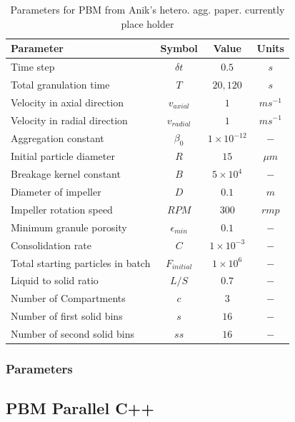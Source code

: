 \documentclass[preprint,11pt,authoryear]{elsarticle}
\begin{document}
	\begin{table}[!htb]
	\caption{Parameters for PBM from Anik's hetero. agg. paper. currently place holder} \label{table:mthds_pbm_parameters}
	\begin{center}
	\begin{tabular}{l|c|c|c}
	\hline
	\bf{Parameter} &\bf{Symbol} &\bf{Value} &\bf{Units}\\
	\hline
	Time step & $\delta t$ & $0.5$ & $s$\\
	Total granulation time & $T$ & $20, 120$ & $s$\\
	Velocity in axial direction & $v_{axial}$ & $1$ & $ms^{-1}$\\
	Velocity in radial direction & $v_{radial}$ & $1$ & $ms^{-1}$\\
	Aggregation constant & $\beta_0$ & $1\times10^{-12}$ & $-$\\
	Initial particle diameter & $R$ & $15$ & $\mu m$\\
	Breakage kernel constant & $B$ & $5\times10^{4}$ & $-$\\
	Diameter of impeller & $D$ & $0.1$ & $m$ \\
	Impeller rotation speed & $RPM$ & $300$ & $rmp$\\
	Minimum granule porosity & $\epsilon_{min}$ & $0.1$ & $-$\\
	Consolidation rate & $C$ & $1\times10^{-3}$ & $-$\\
	Total starting particles in batch & $F_{initial}$ & $1 \times 10^{6}$ & $-$\\
	Liquid to solid ratio & $L/S$ & $0.7$ & $-$ \\
	Number of Compartments & $c$ & $3$ & $-$ \\
	Number of first solid bins & $s$ & $16$ & $-$\\
	Number of second solid bins & $ss$ & $16$ & $-$\\
	\hline
	\end{tabular}
	\end{center}
	\end{table}
	
	    \subsubsection{Parameters}
	    
	    
	  \subsection{PBM Parallel C++}
\end{document}
